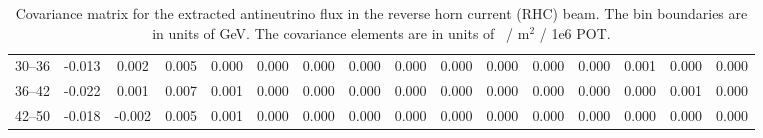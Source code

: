 \begin{table}[tb]
{\begin{tabular}{c|ccccccccccccccc}
    30--36 &  -0.013 &  0.002 &  0.005 &  0.000 &  0.000 &  0.000 &  0.000 &  0.000 &  0.000 &  0.000 &  0.000 &  0.000 &  0.001 &  0.000 &  0.000 \\
    36--42 &  -0.022 &  0.001 &  0.007 &  0.001 &  0.000 &  0.000 &  0.000 &  0.000 &  0.000 &  0.000 &  0.000 &  0.000 &  0.000 &  0.001 &  0.000 \\
    42--50 &  -0.018 & -0.002 &  0.005 &  0.001 &  0.000 &  0.000 &  0.000 &  0.000 &  0.000 &  0.000 &  0.000 &  0.000 &  0.000 &  0.000 &  0.000 \\
    \hline
    \end{tabular} }
\caption{Covariance matrix for the extracted antineutrino flux in the reverse horn current (RHC) beam. The bin boundaries are in units of GeV. The covariance elements are in units of \numubar~/ m$^2$ / 1e6 POT.}
\label{cov:RHC-anti-flux}
\end{table}


